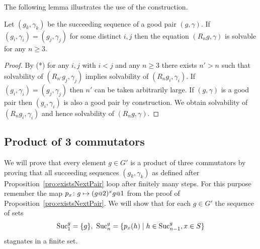 \documentclass[a4paper,11pt]{amsart}
\begin{document}
  The following lemma illustrates the use of the construction.

  \begin{lem}
  Let $(g_k,\gamma_k)$ be the succeeding sequence of a good pair $(g,\gamma)$. 
  If $(g_i,\gamma_i) = (g_j,\gamma_j)$ for some distinct $i,j$ then the equation $(R_ng,\gamma)$ is solvable for 
  any $n \ge 3$.
  \end{lem}
  \begin{proof}
  By (*) for any $i,j$ with $i < j$ and any $n \ge 3$ there exists $n' > n$ such that solvability of 
  $(R_{n'}g_j,\gamma_j)$ implies solvability of $(R_{n}g_i,\gamma_i)$. If $(g_i,\gamma_i) = (g_j,\gamma_j)$
  then $n'$ can be taken arbitrarily large. If $(g,\gamma)$ is a good pair then $(g_i,\gamma_i)$ is also a good pair
  by construction. We obtain solvability of $(R_n g_i,\gamma_i)$ and hence solvability of $(R_n g,\gamma)$.
  \end{proof}

 
 
%  
%  
\subsection{Product of 3 commutators}
We will prove that every element $g\in G'$ is a product of three commutators by proving that all
succeeding sequences $(g_k,\gamma_k)$ as defined after Proposition~\ref{pro:existsNextPair} 
loop after finitely many steps.
For this purpose remember the map $p_x\colon g \mapsto (g\at{2})^x g\at{1}$ from the proof of Proposition~\ref{pro:existsNextPair}.
We will show that for each $g\in G'$ the sequence of sets 
\[\textup{Suc}_1^g=\{g\},\ \textup{Suc}_n^g = \{p_x(h) \mid h\in \textup{Suc}_{n-1}^g, x\in S\} \]
stagnates in a finite set. 
\end{document}
